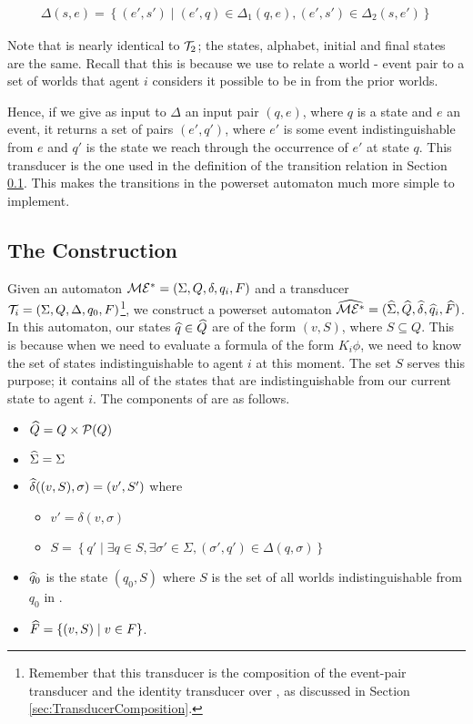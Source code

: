 \documentclass[10pt, a4paper]{report}
\begin{document}
\begin{align*}
  \Delta(s, e) = \left\{ (e', s') \mid (e', q) \in \Delta_1(q, e), (e', s') \in \Delta_2(s, e') \right\} 
\end{align*}

Note that  is nearly identical to $\mathcal{T}_2$; the states, alphabet,
initial and final states are the same. Recall that this is because we use
 to relate a world - event pair to a set of worlds that agent $i$
considers it possible to be in from the prior worlds. 

Hence, if we give as input to $\Delta$ an input pair $(q, e)$, where $q$ is a
state and $e$ an event, it returns a set of pairs $(e', q')$, where $e'$ is some
event indistinguishable from $e$ and $q'$ is the state we reach through the
occurrence of $e'$ at state $q$. This transducer is the one used in the
definition of the transition relation in Section \ref{sec:Powerset}. This makes
the transitions in the powerset automaton much more simple to implement.

\subsection{The Construction}
\label{sec:Powerset}

Given an automaton $\mathcal{ME^\ast} = (\Sigma, Q, \delta, q_i, F)$ and a transducer
$\mathcal{T}_i = (\Sigma, Q, \Delta, q_0, F)$\footnote{Remember that this transducer
  is the composition of the event-pair transducer and the identity transducer
  over \mestar, as discussed in Section \ref{sec:TransducerComposition}.}, we construct a powerset
automaton $\widehat{\mathcal{ME^\ast}} = (\widehat{\Sigma}, \widehat{Q}, \widehat{\delta}, \widehat{q}_i,
\widehat{F})$. In this automaton, our states $\widehat{q} \in \widehat{Q}$ are of the form $(v,
S)$, where $S \subseteq Q$. This is because when we need to evaluate a formula
of the form $K_i\phi$, we need to know the set of states indistinguishable
to agent $i$ at this moment. The set $S$ serves this purpose; it contains all of
the states that are indistinguishable from our current state to agent $i$. The
components of \mestar are as follows. 

\begin{itemize}
\item $\widehat{Q} = Q \times \mathcal{P}(Q)$
\item $\widehat{\Sigma} = \Sigma$ 
\item $\widehat{\delta}((v, S), \sigma) = (v', S')$ where
  \begin{itemize}
  \item $v' =  \delta(v, \sigma)$
  \item $S = \left\{q' \mid \exists q \in S, \exists \sigma' \in \Sigma,
      (\sigma', q') \in \Delta(q, \sigma) \right\}$
  \end{itemize}
\item $\widehat{q}_0$ is the state $(q_0, S)$ where $S$ is the set of all worlds
  indistinguishable from $q_0$ in \mestar.
\item $\widehat{F} = \left\{ (v, S) \mid v \in F \right\}$.
\end{itemize}
\end{document}
